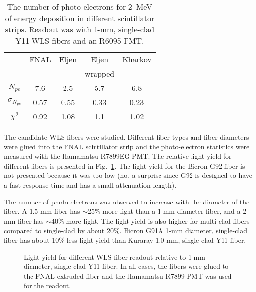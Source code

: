 \begin{table}[ht!]
\begin{center}
\begin{tabular}{|c||c|c|c|c|} \hline 
         & FNAL & Eljen & Eljen   & Kharkov \\
         &      &       & wrapped &         \\ \hline 
$N_{pe}$ & 7.6  & 2.5   & 5.7     & 6.8     \\ \hline 
$\sigma_{N_{pe}}$ & 0.57 & 0.55 & 0.33 & 0.23 \\ \hline 
$\chi^2$ & 0.92 & 1.08 & 1.1 & 1.02 \\ \hline  
\end{tabular} 
\end{center} 
\caption{\small{The number of photo-electrons for 2~MeV of energy deposition 
in different scintillator strips. Readout was with 1-mm, single-clad Y11 WLS
fibers and an R6095 PMT.}} 
\label{tab:scint} 
\end{table} 

The candidate WLS fibers were studied. Different fiber types and fiber
diameters were glued into the FNAL scintillator strip and the photo-electron 
statistics were measured with the Hamamatsu R7899EG PMT.  The relative light 
yield for different fibers is presented in Fig.~\ref{fig:wfs}.  The light 
yield for the Bicron G92 fiber is not presented because it was too low (not a 
surprise since G92 is designed to have a fast response time and has a small 
attenuation length).

The number of photo-electrons was observed to increase with the diameter of 
the fiber.  A 1.5-mm fiber has $\sim$25\% more light than a 1-mm diameter 
fiber, and a 2-mm fiber has $\sim$40\% more light.  The light yield is also 
higher for multi-clad fibers compared to single-clad by about 20\%.  Bicron 
G91A 1-mm diameter, single-clad fiber has about 10\% less light yield than 
Kuraray 1.0-mm, single-clad Y11 fiber.

\begin{figure}[ht!]
\vspace{110mm} 
\caption{\small{Light yield for different WLS fiber readout relative to 1-mm
diameter, single-clad Y11 fiber. In all cases, the fibers were glued to the
FNAL extruded fiber and the Hamamatsu R7899 PMT was used for the readout.}} 
\label{fig:wfs}
\end{figure}

